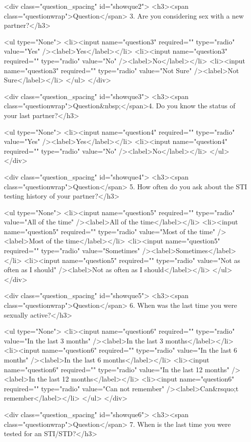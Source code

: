 {{{{{<div class="question_spacing" id="showque2">
<h3><span class="questionwrap">Question</span> 3. Are you considering sex with a new partner?</h3>

<ul type="None">
    <li><input name="question3" required="" type="radio" value="Yes" /><label>Yes</label></li>
    <li><input name="question3" required="" type="radio" value="No" /><label>No</label></li>
    <li><input name="question3" required="" type="radio" value="Not Sure" /><label>Not Sure</label></li>
</ul>
</div>

<div class="question_spacing" id="showque3">
<h3><span class="questionwrap">Question&nbsp;</span>4. Do you know the status of your last partner?</h3>

<ul type="None">
    <li><input name="question4" required="" type="radio" value="Yes" /><label>Yes</label></li>
    <li><input name="question4" required="" type="radio" value="No" /><label>No</label></li>
</ul>
</div>

<div class="question_spacing" id="showque4">
<h3><span class="questionwrap">Question</span> 5. How often do you ask about the STI testing history of your partner?</h3>

<ul type="None">
    <li><input name="question5" required="" type="radio" value="All of the time" /><label>All of the time</label></li>
    <li><input name="question5" required="" type="radio" value="Most of the time" /><label>Most of the time</label></li>
    <li><input name="question5" required="" type="radio" value="Sometimes" /><label>Sometimes</label></li>
    <li><input name="question5" required="" type="radio" value="Not as often as I should" /><label>Not as often as I should</label></li>
</ul>
</div>

<div class="question_spacing" id="showque5">
<h3><span class="questionwrap">Question</span> 6. When was the last time you were sexually active?</h3>

<ul type="None">
    <li><input name="question6" required="" type="radio" value="In the last 3 months" /><label>In the last 3 months</label></li>
    <li><input name="question6" required="" type="radio" value="In the last 6 months" /><label>In the last 6 months</label></li>
    <li><input name="question6" required="" type="radio" value="In the last 12 months" /><label>In the last 12 months</label></li>
    <li><input name="question6" required="" type="radio" value="Can not remember" /><label>Can&rsquo;t remember</label></li>
</ul>
</div>

<div class="question_spacing" id="showque6">
<h3><span class="questionwrap">Question</span> 7. When is the last time you were tested for an STI/STD?</h3>

}}}}}
